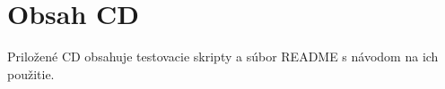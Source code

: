 \chapter{Obsah CD}

Priložené CD obsahuje testovacie skripty a súbor README s návodom na ich použitie.


